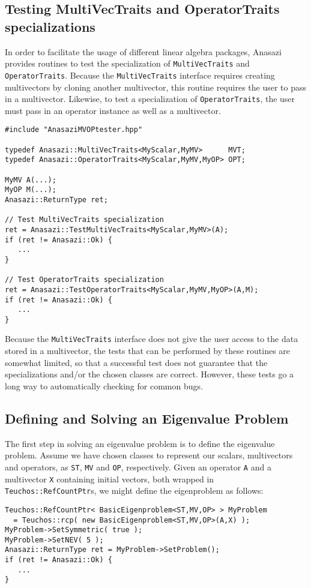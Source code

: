 \subsection{Testing MultiVecTraits and OperatorTraits specializations}
\label{sec:anasazi:MVOPtester}

In order to facilitate the usage of different linear algebra packages, Anasazi
provides routines to test the specialization of \verb!MultiVecTraits! and
\verb!OperatorTraits!. Because the \verb!MultiVecTraits! interface requires
creating multivectors by cloning another multivector, this routine requires the
user to pass in a multivector. Likewise, to test a specialization of
\verb!OperatorTraits!, the user must pass in an operator instance as well as a
multivector.
\begin{verbatim}
#include "AnasaziMVOPtester.hpp"

typedef Anasazi::MultiVecTraits<MyScalar,MyMV>      MVT;
typedef Anasazi::OperatorTraits<MyScalar,MyMV,MyOP> OPT;

MyMV A(...);
MyOP M(...);
Anasazi::ReturnType ret;

// Test MultiVecTraits specialization
ret = Anasazi::TestMultiVecTraits<MyScalar,MyMV>(A);
if (ret != Anasazi::Ok) {
   ...
}

// Test OperatorTraits specialization
ret = Anasazi::TestOperatorTraits<MyScalar,MyMV,MyOP>(A,M);
if (ret != Anasazi::Ok) {
   ...
}
\end{verbatim}

Because the \verb!MultiVecTraits! interface does not give the user access to the
data stored in a multivector, the tests that can be performed by these routines
are somewhat limited, so that a successful test does not guarantee that the
specializations and/or the chosen classes are correct. However, these tests go a
long way to automatically checking for common bugs.

\subsection{Defining and Solving an Eigenvalue Problem}
\label{sec:anasazi:example}

The first step in solving an eigenvalue problem is to define the eigenvalue
problem. Assume we have chosen classes to represent our scalars, multivectors
and operators, as \verb!ST!, \verb!MV! and \verb!OP!, respectively. Given an
operator \verb!A! and a multivector \verb!X! containing initial vectors, both
wrapped in \verb!Teuchos::RefCountPtr!s, we might define the eigenproblem as
follows:
\begin{verbatim}
Teuchos::RefCountPtr< BasicEigenproblem<ST,MV,OP> > MyProblem 
  = Teuchos::rcp( new BasicEigenproblem<ST,MV,OP>(A,X) );
MyProblem->SetSymmetric( true );
MyProblem->SetNEV( 5 );
Anasazi::ReturnType ret = MyProblem->SetProblem();
if (ret != Anasazi::Ok) {
   ...
}
\end{verbatim}

